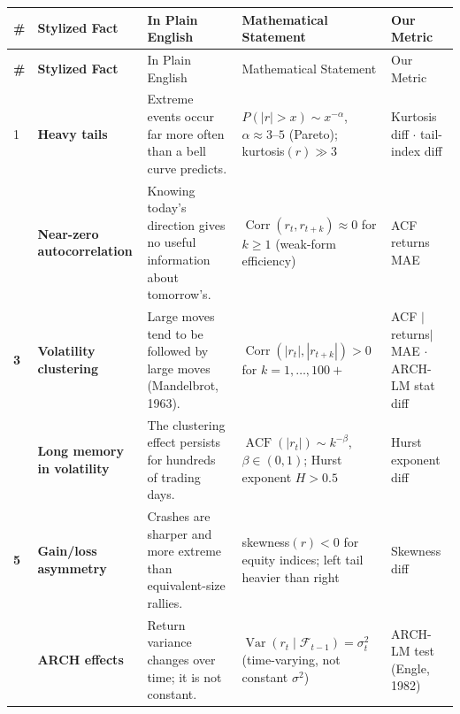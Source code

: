 \documentclass[10pt]{article}
\begin{document}
\vspace{2pt}
\small
\setlength{\tabcolsep}{5pt}
\renewcommand{\arraystretch}{1.4}
\begin{longtable}{%
  >{\bfseries\centering}p{}
  >{\bfseries}p{}
  p{}
  p{}
  p{}}

\rowcolor{Navy}
{\color{white}\#} &
{\color{white}Stylized Fact} &
{\color{white}In Plain English} &
{\color{white}Mathematical Statement} &
{\color{white}Our Metric} \\[2pt]
\endfirsthead
\rowcolor{Navy}
{\color{white}\#} &
{\color{white}Stylized Fact} &
{\color{white}In Plain English} &
{\color{white}Mathematical Statement} &
{\color{white}Our Metric} \\[2pt]
\endhead

\rowcolor{TabOdd}
1 & Heavy tails &
  Extreme events occur far more often than a bell curve predicts. &
  $P(|r|>x) \sim x^{-\alpha}$, $\alpha \approx 3$--$5$ (Pareto); kurtosis$(r) \gg 3$ &
  Kurtosis diff $\cdot$ tail-index diff \\

2 & Near-zero autocorrelation &
  Knowing today's direction gives no useful information about tomorrow's. &
  $\operatorname{Corr}(r_t, r_{t+k}) \approx 0$ for $k \geq 1$ (weak-form efficiency) &
  ACF returns MAE \\

\rowcolor{TabOdd}
3 & Volatility clustering &
  Large moves tend to be followed by large moves (Mandelbrot, 1963). &
  $\operatorname{Corr}(|r_t|, |r_{t+k}|) > 0$ for $k = 1, \ldots, 100{+}$ &
  ACF $|$returns$|$ MAE $\cdot$ ARCH-LM stat diff \\

4 & Long memory in volatility &
  The clustering effect persists for hundreds of trading days. &
  $\operatorname{ACF}(|r_t|) \sim k^{-\beta}$, $\beta \in (0,1)$; Hurst exponent $H > 0.5$ &
  Hurst exponent diff \\

\rowcolor{TabOdd}
5 & Gain/loss asymmetry &
  Crashes are sharper and more extreme than equivalent-size rallies. &
  skewness$(r) < 0$ for equity indices; left tail heavier than right &
  Skewness diff \\

6 & ARCH effects &
  Return variance changes over time; it is not constant. &
  $\operatorname{Var}(r_t \mid \mathcal{F}_{t-1}) = \sigma^2_t$ (time-varying, not constant $\sigma^2$) &
  ARCH-LM test (Engle, 1982) \\


\end{longtable}
\end{document}
